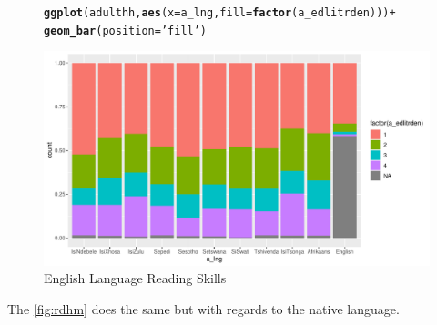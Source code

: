\documentclass[a4paper,british]{article}\usepackage[]{graphicx}\usepackage[]{xcolor}
\makeatletter
\def\maxwidth{ %
  \ifdim\Gin@nat@width>\linewidth
    \linewidth
  \else
    \Gin@nat@width
  \fi
}
\newcommand{\hlstr}[1]{\textcolor[rgb]{0.192,0.494,0.8}{#1}}%
\newcommand{\hlopt}[1]{\textcolor[rgb]{0,0,0}{#1}}%
\newcommand{\hlstd}[1]{\textcolor[rgb]{0.345,0.345,0.345}{#1}}%
\newcommand{\hlkwc}[1]{\textcolor[rgb]{0.333,0.667,0.333}{#1}}%
\newcommand{\hlkwd}[1]{\textcolor[rgb]{0.737,0.353,0.396}{\textbf{#1}}}%
\newenvironment{kframe}{%
 \def\at@end@of@kframe{}%
 \ifinner\ifhmode%
  \def\at@end@of@kframe{\end{minipage}}%
  \begin{minipage}{\columnwidth}%
 \fi\fi%
 \def\FrameCommand##1{\hskip\@totalleftmargin \hskip-\fboxsep
 \colorbox{shadecolor}{##1}\hskip-\fboxsep
     \hskip-\linewidth \hskip-\@totalleftmargin \hskip\columnwidth}%
 \MakeFramed {\advance\hsize-\width
   \@totalleftmargin\z@ \linewidth\hsize
   \@setminipage}}%
 {\par\unskip\endMakeFramed%
 \at@end@of@kframe}
\newenvironment{knitrout}{}{} %
\let\ref\autoref
\makeatother
\begin{document}
\begin{figure}[H]
\caption{English Language Reading Skills}
\label{fig:rden}

\begin{knitrout}
\color{fgcolor}\begin{kframe}
\begin{alltt}
\hlkwd{ggplot}\hlstd{(adulthh,} \hlkwd{aes}\hlstd{(}\hlkwc{x} \hlstd{= a_lng,} \hlkwc{fill} \hlstd{=} \hlkwd{factor}\hlstd{(a_edlitrden)) )} \hlopt{+}
        \hlkwd{geom_bar}\hlstd{(}\hlkwc{position} \hlstd{=} \hlstr{'fill'}\hlstd{)}
\end{alltt}
\end{kframe}
\includegraphics[width=\maxwidth]{../misc/latex-read_english-1} 
\end{knitrout}
\end{figure}

The \ref{fig:rdhm} does the same but with regards to the native language.
\end{document}
